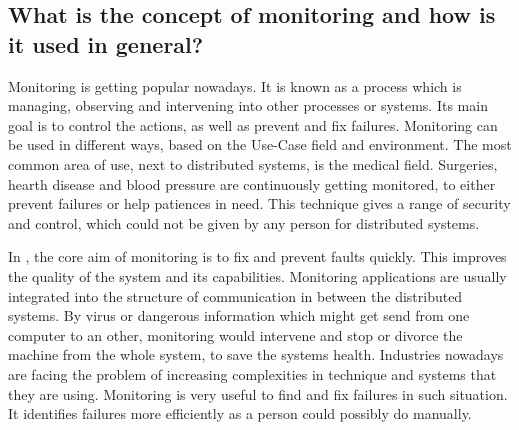 \subsection{What is the concept of monitoring and how is it used in general?}

\label{subsec:ConceptMonitoring}
Monitoring is getting popular nowadays. 
It is known as a process which is managing, observing and intervening into other processes or systems.\cite{Jammes2012} 
Its main goal is to control the actions, as well as prevent and fix failures.\cite{Dinu2011} 
Monitoring can be used in different ways, based on the Use-Case field and environment.\cite{Dinu2011} 
The most common area of use, next to distributed systems,\cite{Jammes2012} is the medical field. 
Surgeries, hearth disease and blood pressure are continuously getting monitored, to either prevent failures or help patiences in need. 
This technique gives a range of security and control, which could not be given by any person for distributed systems.\cite{Jammes2012}

 In \isds, the core aim of monitoring is to fix and prevent faults quickly. 
 This improves the quality of the system and its capabilities. 
 Monitoring applications are usually integrated into the structure of communication in between the distributed systems.\cite{Jammes2012} 
 By virus or dangerous information which might get send from one computer to an other, monitoring would intervene and stop or divorce the machine from the whole system, to save the systems health. 
 Industries nowadays are facing the problem of increasing complexities in technique and systems that they are using.\cite{Jammes2012} 
 Monitoring is very useful to find and fix failures in such situation. 
 It identifies failures more efficiently as a person could possibly do manually.\cite{Jammes2012}
 
